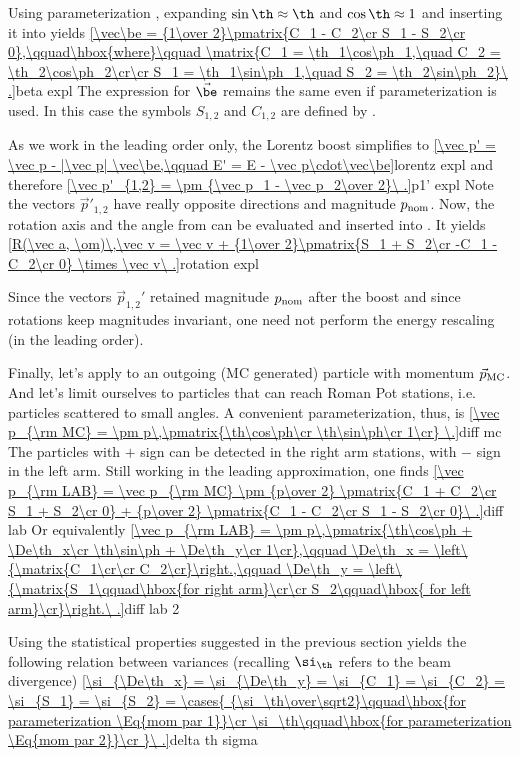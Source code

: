 Using parameterization , expanding $\sin\th\approx\th$ and $\cos\th\approx 1$ and inserting it into  yields
\eqref{\vec\be = {1\over 2}\pmatrix{C_1 - C_2\cr S_1 - S_2\cr 0},\qquad\hbox{where}\qquad \matrix{C_1 = \th_1\cos\ph_1,\quad C_2 = \th_2\cos\ph_2\cr\cr S_1 = \th_1\sin\ph_1,\quad S_2 = \th_2\sin\ph_2}\ .}{beta expl}
The expression for $\vec\be$ remains the same even if parameterization  is used. In this case the symbols $S_{1,2}$ and $C_{1,2}$ are defined by .

As we work in the leading order only, the Lorentz boost  simplifies to
\eqref{\vec p' = \vec p - |\vec p| \vec\be,\qquad E' = E - \vec p\cdot\vec\be}{lorentz expl}
and therefore
\eqref{\vec p'_{1,2} = \pm {\vec p_1 - \vec p_2\over 2}\ .}{p1' expl}
Note the vectors $\vec p'_{1, 2}$ have really opposite directions and magnitude $p_{\rm nom}$. Now, the rotation axis and the angle from  can be evaluated and inserted into . It yields
\eqref{R(\vec a, \om)\,\vec v = \vec v + {1\over 2}\pmatrix{S_1 + S_2\cr -C_1 - C_2\cr 0} \times \vec v\ .}{rotation expl}

Since the vectors $\vec p_{1, 2}'$ retained magnitude $p_{\rm nom}$ after the boost and since rotations keep magnitudes invariant, one need not perform the energy rescaling (in the leading order).

Finally, let's apply  to an outgoing (MC generated) particle with momentum $\vec p_{\rm MC}$. And let's limit ourselves to particles that can reach Roman Pot stations, i.e. particles scattered to small angles. A convenient parameterization, thus, is
\eqref{\vec p_{\rm MC} = \pm p\,\pmatrix{\th\cos\ph\cr \th\sin\ph\cr 1\cr} \.}{diff mc}
The particles with $+$ sign can be detected in the right arm stations, with $-$ sign in the left arm. Still working in the leading approximation, one finds
\eqref{\vec p_{\rm LAB} = \vec p_{\rm MC} \pm {p\over 2} \pmatrix{C_1 + C_2\cr S_1 + S_2\cr 0} + {p\over 2} \pmatrix{C_1 - C_2\cr S_1 - S_2\cr 0}\ .}{diff lab}
Or equivalently
\eqref{\vec p_{\rm LAB} = \pm p\,\pmatrix{\th\cos\ph + \De\th_x\cr \th\sin\ph + \De\th_y\cr 1\cr},\qquad \De\th_x = \left\{\matrix{C_1\cr\cr C_2\cr}\right.,\qquad \De\th_y = \left\{\matrix{S_1\qquad\hbox{for right arm}\cr\cr S_2\qquad\hbox{ for left arm}\cr}\right.\ .}{diff lab 2} %

Using the statistical properties suggested in the previous section yields the following relation between variances (recalling $\si_\th$ refers to the beam divergence)
\eqref{\si_{\De\th_x} = \si_{\De\th_y} = \si_{C_1} = \si_{C_2} = \si_{S_1} = \si_{S_2} = \cases{
{\si_\th\over\sqrt2}\qquad\hbox{for parameterization \Eq{mom par 1}}\cr
\si_\th\qquad\hbox{for parameterization \Eq{mom par 2}}\cr
}\ .}{delta th sigma}


